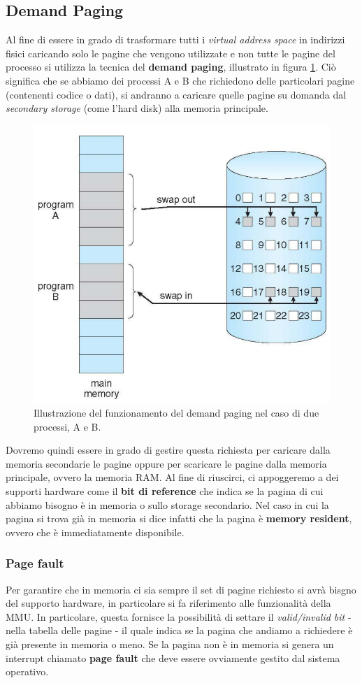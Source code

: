 \subsection{Demand Paging}
Al fine di essere in grado di trasformare tutti i \textit{virtual address space} in indirizzi fisici caricando solo le pagine che vengono utilizzate e non tutte le pagine del processo si utilizza la tecnica del \textbf{demand paging}, illustrato in figura \ref{fig:demand_paging}. Ciò significa che se abbiamo dei processi A e B che richiedono delle particolari pagine (contenenti codice o dati), si andranno a caricare quelle pagine su domanda dal \textit{secondary storage} (come l'hard disk) alla memoria principale.
\begin{figure}[h]
    \centering
    \includegraphics[width = .55\textwidth]{../res/imgs/virtual memory/demand_paging.png}
    \caption{Illustrazione del funzionamento del demand paging nel caso di due processi, A e B.}
    \label{fig:demand_paging}
\end{figure}
Dovremo quindi essere in grado di gestire questa richiesta per caricare dalla memoria secondarie le pagine oppure per scaricare le pagine dalla memoria principale, ovvero la memoria RAM. Al fine di riuscirci, ci appoggeremo a dei supporti hardware come il \textbf{bit di reference} che indica se la pagina di cui abbiamo bisogno è in memoria o sullo storage secondario. Nel caso in cui la pagina si trova già in memoria si dice infatti che la pagina è \textbf{memory resident}, ovvero che è immediatamente disponibile.

%
\subsubsection{Page fault}\label{page fault}
Per garantire che in memoria ci sia sempre il set di pagine richiesto si avrà bisgno del supporto hardware, in particolare si fa riferimento alle funzionalità della MMU. In particolare, questa fornisce la possibilità di settare il \textit{valid/invalid bit} - nella tabella delle pagine - il quale indica se la pagina che andiamo a richiedere è già presente in memoria o meno. Se la pagina non è in memoria si genera un interrupt chiamato \textbf{page fault} che deve essere ovviamente gestito dal sistema operativo.

